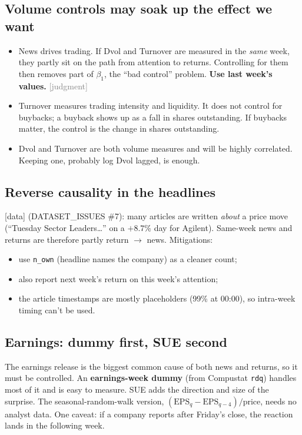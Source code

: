 \documentclass[11pt]{article}
\newcommand{\data}{\textcolor{NavyBlue}{\textsf{[data]}}}
\newcommand{\judg}{\textcolor{Gray}{\textsf{[judgment]}}}
\newcommand{\var}[1]{\texttt{#1}}
\begin{document}
\subsection{Volume controls may soak up the effect we want}
\begin{itemize}
  \item News drives trading. If Dvol and Turnover are measured in the \emph{same} week, they partly sit on the path from attention to returns. Controlling for them then removes part of $\beta_1$, the ``bad control'' problem. \textbf{Use last week's values.} \judg{}
  \item Turnover measures trading intensity and liquidity. It does not control for buybacks; a buyback shows up as a fall in shares outstanding. If buybacks matter, the control is the change in shares outstanding.
  \item Dvol and Turnover are both volume measures and will be highly correlated. Keeping one, probably log Dvol lagged, is enough.
\end{itemize}

\subsection{Reverse causality in the headlines}
\data{} (DATASET\_ISSUES \#7): many articles are written \emph{about} a price move (``Tuesday Sector Leaders\ldots'' on a $+8.7\%$ day for Agilent). Same-week news and returns are therefore partly return $\rightarrow$ news. Mitigations:
\begin{itemize}
  \item use \var{n\_own} (headline names the company) as a cleaner count;
  \item also report next week's return on this week's attention;
  \item the article timestamps are mostly placeholders (99\% at 00:00), so intra-week timing can't be used.
\end{itemize}

\subsection{Earnings: dummy first, SUE second}
The earnings release is the biggest common cause of both news and returns, so it must be controlled. An \textbf{earnings-week dummy} (from Compustat \var{rdq}) handles most of it and is easy to measure. SUE adds the direction and size of the surprise. The seasonal-random-walk version, $(\text{EPS}_q - \text{EPS}_{q-4})/\text{price}$, needs no analyst data. One caveat: if a company reports after Friday's close, the reaction lands in the following week.
\end{document}
